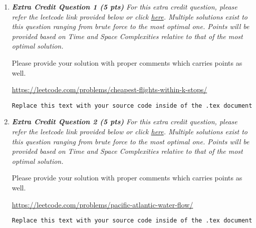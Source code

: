 \documentclass[12pt]{article}
\begin{document}
\begin{enumerate}
\item{\itshape \textbf{Extra Credit Question 1 (5 pts)}
    For this extra credit question, please refer the leetcode link provided below or click \href{https://leetcode.com/problems/cheapest-flights-within-k-stops/}{here}. Multiple solutions exist to this question ranging from brute force to the most optimal one. Points will be provided based on Time and Space Complexities relative to that of the most optimal solution.

    Please provide your solution with proper comments which carries points as well.}
    
   \url{https://leetcode.com/problems/cheapest-flights-within-k-stops/}

\begin{verbatim}
Replace this text with your source code inside of the .tex document
\end{verbatim}	

\item{\itshape \textbf{Extra Credit Question 2 (5 pts)}
    For this extra credit question, please refer the leetcode link provided below or click \href{https://leetcode.com/problems/pacific-atlantic-water-flow/}{here}. Multiple solutions exist to this question ranging from brute force to the most optimal one. Points will be provided based on Time and Space Complexities relative to that of the most optimal solution.

    Please provide your solution with proper comments which carries points as well.}
    
   \url{https://leetcode.com/problems/pacific-atlantic-water-flow/}

\begin{verbatim}
Replace this text with your source code inside of the .tex document
\end{verbatim}	

\end{enumerate}
\end{document}
